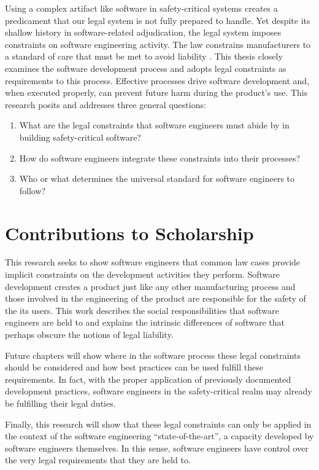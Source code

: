 \documentclass[12pt]{report}
\begin{document}
Using a complex artifact like software in safety-critical systems creates a predicament that our legal system is not fully prepared to handle. Yet despite its shallow history in software-related adjudication, the legal system imposes constraints on software engineering activity. The law constrains manufacturers to a standard of care that must be met to avoid liability \cite{FAKE}. This thesis closely examines the software development process and adopts legal constraints as requirements to this process. Effective processes drive software development and, when executed properly, can prevent future harm during the product's use. This research posits and addresses three general questions: \singlespace 
\begin{enumerate} 
\item What are the legal constraints that software engineers must abide by in building safety-critical software? 
\item How do software engineers integrate these constraints into their processes? 
\item Who or what determines the universal standard for software engineers to follow? 
\end{enumerate}\doublespace 

\section{Contributions to Scholarship} 

This research seeks to show software engineers that common law cases provide implicit constraints on the development activities they perform. Software development  creates a product just like any other manufacturing process and those involved in the engineering of the product are responsible for the safety of the its users. This work describes the social responsibilities that software engineers are held to and explains the intrinsic differences of software that perhaps obscure the notions of legal liability.

Future chapters will show where in the software process these legal constraints should be considered and how best practices can be used fulfill these requirements. In fact, with the proper application of previously documented development practices, software engineers in the safety-critical realm may already be fulfilling their legal duties.

Finally, this research will show that these legal constraints can only be applied in the context of the software engineering ``state-of-the-art'', a capacity developed by software engineers themselves. In this sense, software engineers have control over the very legal requirements that they are held to.
\end{document}
